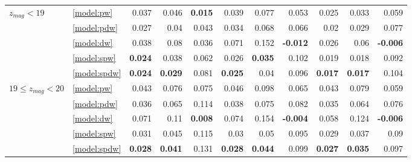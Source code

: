 \documentclass[fleqn,usenatbib]{mnras}
\begin{document}
\begin{table}
\begin{tabular}{llrrrrrrrrr}
\hline
\hline
            $z_{mag} < 19$ & \ref{model:pw} &                0.037 &           0.046 &   \textbf{0.015} &            0.039 &           0.077 &            0.053 &            0.025 &           0.033 &            0.059 \\
                                   & \ref{model:pdw} &                0.027 &            0.04 &            0.043 &            0.034 &           0.068 &            0.066 &             0.02 &           0.029 &            0.077 \\
                                   & \ref{model:dw} &                0.038 &            0.08 &            0.036 &            0.071 &           0.152 &  \textbf{-0.012} &            0.026 &            0.06 &  \textbf{-0.006} \\
                                   & \ref{model:spw} &       \textbf{0.024} &           0.038 &            0.062 &            0.026 &  \textbf{0.035} &            0.102 &            0.019 &           0.018 &            0.092 \\
                                   & \ref{model:spdw} &       \textbf{0.024} &  \textbf{0.029} &            0.081 &   \textbf{0.025} &            0.04 &            0.096 &   \textbf{0.017} &  \textbf{0.017} &            0.104 \\
\hline
            $19 \leq z_{mag} < 20$ & \ref{model:pw} &                0.043 &           0.076 &            0.075 &            0.046 &           0.098 &            0.065 &            0.043 &           0.079 &            0.059 \\
                                   & \ref{model:pdw} &                0.036 &           0.065 &            0.114 &            0.038 &           0.075 &            0.082 &            0.035 &           0.064 &            0.076 \\
                                   & \ref{model:dw} &                0.071 &            0.11 &   \textbf{0.008} &            0.074 &           0.154 &  \textbf{-0.004} &            0.058 &           0.124 &  \textbf{-0.006} \\
                                   & \ref{model:spw} &                0.031 &           0.045 &            0.115 &             0.03 &            0.05 &            0.095 &            0.029 &           0.037 &             0.09 \\
                                   & \ref{model:spdw} &       \textbf{0.028} &  \textbf{0.041} &            0.131 &   \textbf{0.028} &  \textbf{0.044} &            0.099 &   \textbf{0.027} &  \textbf{0.035} &            0.097 \\

\end{tabular}
\end{table}
\end{document}
